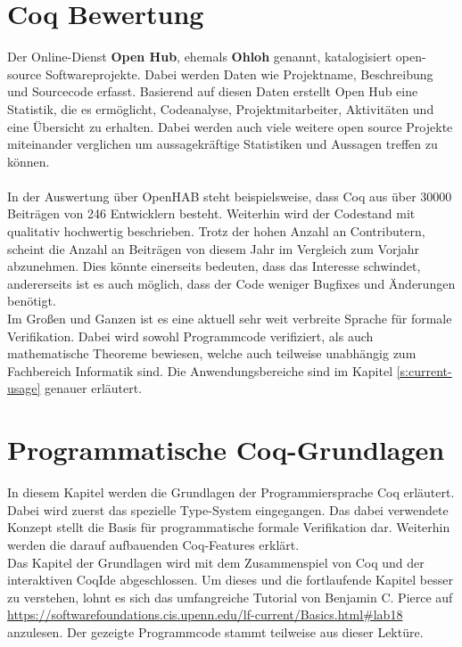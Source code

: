 \section{Coq Bewertung}
Der Online-Dienst \textbf{Open Hub}, ehemals \textbf{Ohloh} genannt, katalogisiert open-source Softwareprojekte. Dabei werden Daten wie Projektname, Beschreibung und Sourcecode erfasst. Basierend auf diesen Daten erstellt Open Hub eine Statistik, die es ermöglicht, Codeanalyse, Projektmitarbeiter, Aktivitäten und eine Übersicht zu erhalten. Dabei werden auch viele weitere open source Projekte miteinander verglichen um aussagekräftige Statistiken und Aussagen treffen zu können.\\
\\
{In der Auswertung über OpenHAB steht beispielsweise, dass Coq aus über 30000 Beiträgen von 246 Entwicklern besteht. Weiterhin wird der Codestand mit qualitativ hochwertig beschrieben. Trotz der hohen Anzahl an Contributern, scheint die Anzahl an Beiträgen von diesem Jahr im Vergleich zum Vorjahr abzunehmen. Dies könnte einerseits bedeuten, dass das Interesse schwindet, andererseits ist es auch möglich, dass der Code weniger Bugfixes und Änderungen benötigt.}\cite{OH01:FV}\\
Im Großen und Ganzen ist es eine aktuell sehr weit verbreite Sprache für formale Verifikation. Dabei wird sowohl Programmcode verifiziert, als auch mathematische Theoreme bewiesen, welche auch teilweise unabhängig zum Fachbereich Informatik sind. Die Anwendungsbereiche sind im Kapitel \ref{s:current-usage} genauer erläutert.

\section{Programmatische Coq-Grundlagen}
In diesem Kapitel werden die Grundlagen der Programmiersprache Coq erläutert. Dabei wird zuerst das spezielle Type-System eingegangen. Das dabei verwendete Konzept stellt die Basis für programmatische formale Verifikation dar. Weiterhin werden die darauf aufbauenden Coq-Features erklärt.\\
Das Kapitel der Grundlagen wird mit dem Zusammenspiel von Coq und der interaktiven CoqIde abgeschlossen. Um dieses und die fortlaufende Kapitel besser zu verstehen, lohnt es sich das umfangreiche Tutorial von Benjamin C. Pierce auf \url{https://softwarefoundations.cis.upenn.edu/lf-current/Basics.html#lab18} anzulesen. Der gezeigte Programmcode stammt teilweise aus dieser Lektüre.\cite{Pierce01:COQ}

